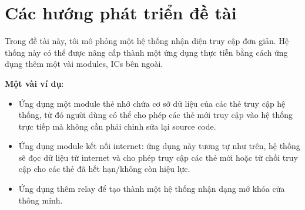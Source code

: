 \section{Các hướng phát triển đề tài}
Trong đề tài này, tôi mô phỏng một hệ thống nhận diện truy cập đơn giản.
Hệ thống này có thể được nâng cấp thành một ứng dụng thực tiễn bằng cách ứng dụng thêm một vài modules, ICs bên ngoài.

\textbf{Một vài ví dụ}:
\begin{itemize}
    \item Ứng dụng một module thẻ nhớ chứa cơ sở dữ liệu của các thẻ truy cập hệ thống, từ đó người dùng có thể cho phép các thẻ mới truy cập vào hệ thống trực tiếp mà không cần phải chỉnh sửa lại source code.
    \item Ứng dụng module kết nối internet: ứng dụng này tương tự như trên, hệ thống sẽ đọc dữ liệu từ internet và cho phép truy cập các thẻ mới hoặc từ chối truy cập cho các thẻ đã hết hạn/không còn hiệu lực.
    \item Ứng dụng thêm relay để tạo thành một hệ thống nhận dạng mở khóa cửa thông minh.
\end{itemize}
